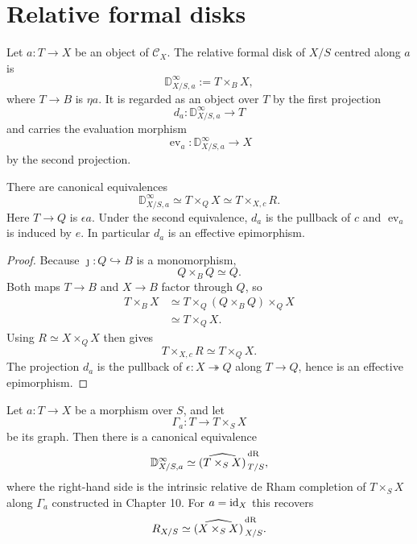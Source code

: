\section{Relative formal disks}
\label{sec:formal-disks}

\begin{definition}
\label{def:relative-formal-disk}
Let $a:T\to X$ be an object of $\mathcal C_X$.  The relative formal disk of $X/S$ centred along $a$ is
\[
    \mathbb D^\infty_{X/S,a}:=T\times_BX,
\]
where $T\to B$ is $\eta a$.  It is regarded as an object over $T$ by the first projection
\[
    d_a:\mathbb D^\infty_{X/S,a}\longrightarrow T
\]
and carries the evaluation morphism
\[
    \operatorname{ev}_a:\mathbb D^\infty_{X/S,a}\longrightarrow X
\]
by the second projection.
\end{definition}

\begin{proposition}
\label{prop:formal-disk-effective-quotient}
There are canonical equivalences
\[
    \boxed{
    \mathbb D^\infty_{X/S,a}
    \simeq
    T\times_QX
    \simeq
    T\times_{X,c}R.
    }
\]
Here $T\to Q$ is $\epsilon a$.  Under the second equivalence, $d_a$ is the pullback of $c$ and $\operatorname{ev}_a$ is induced by $e$.  In particular $d_a$ is an effective epimorphism.
\end{proposition}

\begin{proof}
Because $\jmath:Q\hookrightarrow B$ is a monomorphism,
\[
    Q\times_BQ\simeq Q.
\]
Both maps $T\to B$ and $X\to B$ factor through $Q$, so
\[
\begin{aligned}
T\times_BX
&\simeq
T\times_Q(Q\times_BQ)\times_QX\\
&\simeq
T\times_QX.
\end{aligned}
\]
Using $R\simeq X\times_QX$ then gives
\[
    T\times_{X,c}R
    \simeq
    T\times_QX.
\]
The projection $d_a$ is the pullback of $\epsilon:X\twoheadrightarrow Q$ along $T\to Q$, hence is an effective epimorphism.
\end{proof}

\begin{theorem}
\label{thm:formal-disk-completion}
Let $a:T\to X$ be a morphism over $S$, and let
\[
    \Gamma_a:T\longrightarrow T\times_SX
\]
be its graph.  Then there is a canonical equivalence
\[
    \mathbb D^\infty_{X/S,a}
    \simeq
    \widehat{(T\times_SX)}^{\,\mathrm{dR}}_{\,T/S},
\]
where the right-hand side is the intrinsic relative de Rham completion of $T\times_SX$ along $\Gamma_a$ constructed in Chapter 10.  For $a=\operatorname{id}_X$ this recovers
\[
    R_{X/S}
    \simeq
    \widehat{(X\times_SX)}^{\,\mathrm{dR}}_{\,X/S}.
\]
\end{theorem}

